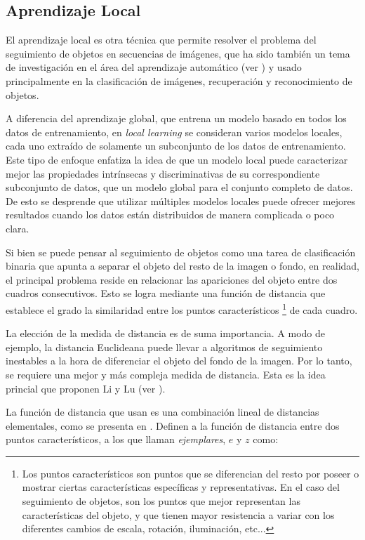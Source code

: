\subsection{Aprendizaje Local}

El aprendizaje local es otra técnica que permite resolver el problema del
seguimiento de objetos en secuencias de imágenes, que ha sido también un tema
de investigación en el área del aprendizaje automático (ver
\cite{local-learning-machine-learning}) y usado principalmente en la
clasificación de imágenes, recuperación y reconocimiento de objetos.

A diferencia del aprendizaje global, que entrena un modelo basado en
todos los datos de entrenamiento, en \textit{local learning} se consideran
varios modelos locales, cada uno extraído de solamente un subconjunto de los
datos de entrenamiento. Este tipo de enfoque enfatiza la idea de que un modelo
local puede caracterizar mejor las propiedades intrínsecas y discriminativas de
su correspondiente subconjunto de datos, que un modelo global para el conjunto
completo de datos. De esto se desprende que utilizar múltiples modelos locales
puede ofrecer mejores resultados cuando los datos están distribuidos de manera
complicada o poco clara.

Si bien se puede pensar al seguimiento de objetos como una tarea de clasificación binaria
que apunta a separar el objeto del resto de la imagen o fondo, en realidad, el principal
problema reside en relacionar las apariciones del objeto entre dos cuadros
consecutivos. Esto se logra mediante una función de distancia que
establece el grado la similaridad entre los puntos característicos \footnote{Los puntos
  característicos son puntos que se diferencian del resto por poseer o mostrar
ciertas características específicas y representativas. En el caso del
seguimiento de objetos, son los puntos que mejor representan las
características del objeto, y que tienen mayor resistencia a variar con los
diferentes cambios de escala, rotación, iluminación, etc...} de cada cuadro.

La elección de la medida de distancia es de suma importancia. A modo de
ejemplo, la distancia Euclideana puede llevar a algoritmos de seguimiento
inestables a la hora de diferenciar el objeto del fondo de la imagen. Por lo
tanto, se requiere una mejor y más compleja medida de distancia. Esta es la
idea princial que proponen Li y Lu (ver \cite{local-learning}).

La función de distancia que usan es una combinación lineal de distancias
elementales, como se presenta en \cite{malisiewicz-cvpr08}. Definen a la
función de distancia entre dos puntos característicos, a los que llaman
\textit{ejemplares}, $e$ y $z$ como:

